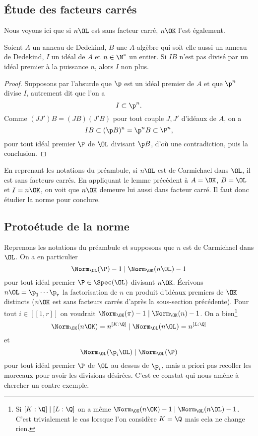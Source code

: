 \documentclass[a4paper, 12pt, oneside]{article}
\begin{document}
\subsection{Étude des facteurs carrés}

Nous voyons ici que si $n\OL$ est sans facteur carré, $n\OK$ l'est également.

\begin{lemme}Soient $A$ un anneau de Dedekind, $B$ une $A$-algèbre qui soit elle aussi un anneau de Dedekind, $I$ un idéal de $A$ et $n\in \N^*$ un entier. Si $IB$ n'est pas divisé par un idéal premier à la puissance $n$, alors $I$ non plus.
\end{lemme}

\begin{proof}
	Supposons par l'absurde que $\p$ est un idéal premier de $A$ et que $\p^n$ divise $I$, autrement dit que l'on a $$I \subset \p^n.$$ Comme $(JJ')B = (JB)(J'B)$ pour tout couple $J, J'$ d'idéaux de $A$, on a $$IB \subset (\p B)^n = \p^n B \subset \P^n,$$ pour tout idéal premier $\P$ de $\OL$ divisant $\p B$, d'où une contradiction, puis la conclusion.
\end{proof}

En reprenant les notations du préambule, si $n\OL$ est de Carmichael dans $\OL$, il est sans facteurs carrés. En appliquant le lemme précédent à $A=\OK$, $B=\OL$ et $I = n\OK$, on voit que $n\OK$ demeure lui aussi dans facteur carré. Il faut donc étudier la norme pour conclure.

\subsection{Protoétude de la norme}

Reprenons les notations du préambule et supposons que $n$ est de Carmichael dans $\OL$. On a en particulier $$\Norm_\OL(\P) - 1 \mid \Norm_\OK(n\OL) - 1$$ pour tout idéal premier $\P\in \Spec(\OL)$ divisant $n\OK$. Écrivons $n\OL = \p_1\cdots \p_r$ la factorisation de $n$ en produit d'idéaux premiers de $\OK$ distincts ($n\OK$ est sans facteurs carrés d'après la sous-section précédente). Pour tout $i\in [\![1, r]\!]$ on voudrait $\Norm_\OK(\pi) - 1\mid \Norm_\OK(n) - 1$. On a bien\footnote{Si $[K : \Q]\mid [L:\Q]$ on a même $\Norm_\OK(n\OK) - 1\mid \Norm_\OL(n\OL) - 1$. C'est trivialement le cas lorsque l'on considère $K=\Q$ mais cela ne change rien.} $$\Norm_\OK(n\OK) = n^{[K : \Q]} \mid \Norm_\OL(n\OL) = n^{[L : \Q]}$$ et $$\Norm_\OL(\p_i \OL) \mid \Norm_\OL(\P)$$ pour tout idéal premier $\P$ de $\OL$ au dessus de $\p_i$, mais a priori pas recoller les morceaux pour avoir les divisions désirées. C'est ce constat qui nous amène à chercher un contre exemple.
\end{document}

